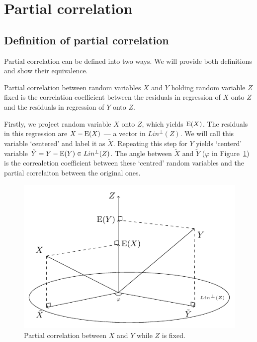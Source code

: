 \section{Partial correlation}

\subsection{Definition of partial correlation}


Partial correlation can be defined into two ways.
We will provide both definitions and show their equivalence.

\begin{definition}
Partial correlation between random variables $X$ and $Y$ holding random variable $Z$
fixed is the correlation coefficient between the residuals in regression of $X$ onto
$Z$ and the residuals in regression of $Y$ onto $Z$.
\end{definition}

Firstly, we project random variable $X$ onto $Z$, which yields $\operatorname{E}(X)$.
The residuals in this regression are $X - \operatorname{E}(X)$ — a vector in $Lin^{\perp}(Z)$.
We will call this variable `centered' and label it as $\widetilde X$.
Repeating this step for $Y$ yields `centerd' variable $\tilde Y = Y - \operatorname{E}(Y) \in Lin^{\perp}(Z)$.
The angle between $\widetilde X$ and $\widetilde Y$ ($\varphi$ in Figure~\ref{fig:pcorr_def1})
is the correaletion coefficient between these `centred' random variables and
the partial correlaiton between the original ones.

\begin{figure}
  \centering
  \includegraphics[width=0.55\linewidth]{figures/03_partial_correlation_definition.pdf}
  \caption{Partial correlation between $X$ and $Y$ while $Z$ is fixed.}
  \label{fig:pcorr_def1}
\end{figure}

